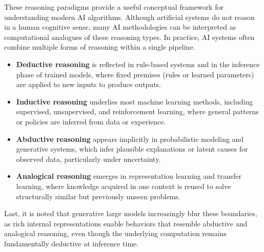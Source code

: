 \documentclass[12pt]{article}
\begin{document}




These reasoning paradigms provide a useful conceptual framework for understanding modern AI algorithms. Although artificial systems do not reason in a human cognitive sense, many AI methodologies can be interpreted as computational analogues of these reasoning types. In practice, AI systems often combine multiple forms of reasoning within a single pipeline.

\begin{itemize}
    \item \textbf{Deductive reasoning} is reflected in rule-based systems and in the inference phase of trained models, where fixed premises (rules or learned parameters) are applied to new inputs to produce outputs.
    
    \item \textbf{Inductive reasoning} underlies most machine learning methods, including supervised, unsupervised, and reinforcement learning, where general patterns or policies are inferred from data or experience.
    
    \item \textbf{Abductive reasoning} appears implicitly in probabilistic modeling and generative systems, which infer plausible explanations or latent causes for observed data, particularly under uncertainty.
    
    \item \textbf{Analogical reasoning} emerges in representation learning and transfer learning, where knowledge acquired in one context is reused to solve structurally similar but previously unseen problems.
\end{itemize}

Last, it is noted that generative large models increasingly blur these boundaries, as rich internal representations enable behaviors that resemble abductive and analogical reasoning, even though the underlying computation remains fundamentally deductive at inference time.
\end{document}
